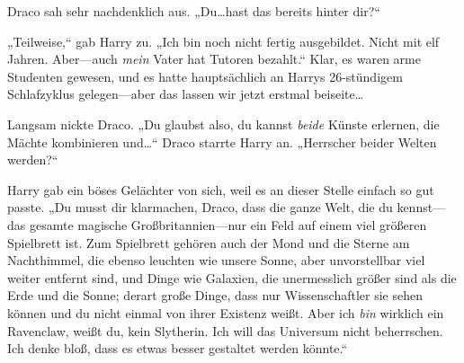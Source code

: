 Draco sah sehr nachdenklich aus. „Du…hast das bereits hinter dir?“

„Teilweise,“ gab Harry zu. „Ich bin noch nicht fertig ausgebildet. Nicht mit elf Jahren. Aber—auch \emph{mein} Vater hat Tutoren bezahlt.“ Klar, es waren arme Studenten gewesen, und es hatte hauptsächlich an Harrys 26-stündigem Schlafzyklus gelegen—aber das lassen wir jetzt erstmal beiseite…

Langsam nickte Draco. „Du glaubst also, du kannst \emph{beide} Künste erlernen, die Mächte kombinieren und…“ Draco starrte Harry an. „Herrscher beider Welten werden?“

Harry gab ein böses Gelächter von sich, weil es an dieser Stelle einfach so gut passte. „Du musst dir klarmachen, Draco, dass die ganze Welt, die du kennst—das gesamte magische Großbritannien—nur ein Feld auf einem viel größeren Spielbrett ist. Zum Spielbrett gehören auch der Mond und die Sterne am Nachthimmel, die ebenso leuchten wie unsere Sonne, aber unvorstellbar viel weiter entfernt sind, und Dinge wie Galaxien, die unermesslich größer sind als die Erde und die Sonne; derart große Dinge, dass nur Wissenschaftler sie sehen können und du nicht einmal von ihrer Existenz weißt. Aber ich \emph{bin} wirklich ein Ravenclaw, weißt du, kein Slytherin. Ich will das Universum nicht beherrschen. Ich denke bloß, dass es etwas besser gestaltet werden könnte.“


